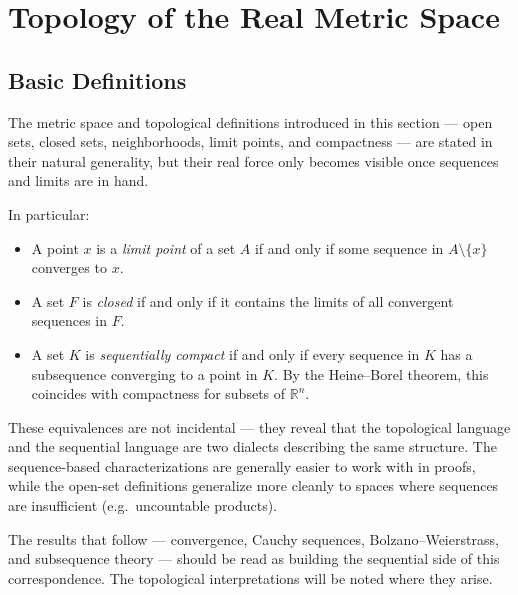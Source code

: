 
\section{Topology of the Real Metric Space}

\subsection{Basic Definitions}


\begin{remark}
The metric space and topological definitions introduced in this section ---
open sets, closed sets, neighborhoods, limit points, and compactness ---
are stated in their natural generality, but their real force only becomes
visible once sequences and limits are in hand.

In particular:
\begin{itemize}
  \item A point $x$ is a \emph{limit point} of a set $A$ if and only if
        some sequence in $A \setminus \{x\}$ converges to $x$.
  \item A set $F$ is \emph{closed} if and only if it contains the limits
        of all convergent sequences in $F$.
  \item A set $K$ is \emph{sequentially compact} if and only if every
        sequence in $K$ has a subsequence converging to a point in $K$.
        By the Heine--Borel theorem, this coincides with compactness for
        subsets of $\mathbb{R}^n$.
\end{itemize}

These equivalences are not incidental --- they reveal that the topological
language and the sequential language are two dialects describing the same
structure. The sequence-based characterizations are generally easier to
work with in proofs, while the open-set definitions generalize more
cleanly to spaces where sequences are insufficient (e.g.\ uncountable
products).

The results that follow --- convergence, Cauchy sequences,
Bolzano--Weierstrass, and subsequence theory --- should be read as
building the sequential side of this correspondence. The topological
interpretations will be noted where they arise.
\end{remark}


